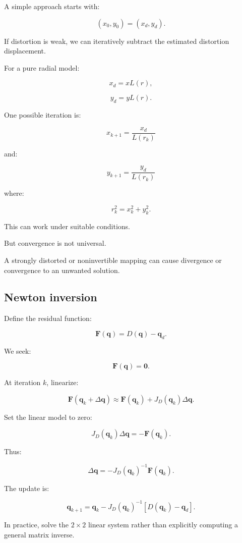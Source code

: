 A simple approach starts with:

\[
 \boxed{ (x_0,y_0)=(x_d,y_d) }.
\]

If distortion is weak, we can iteratively subtract the estimated distortion displacement.

For a pure radial model:

\[
 x_d=xL(r),
\]

\[
 y_d=yL(r).
\]

One possible iteration is:

\[
 \boxed{ x_{k+1}=\frac{x_d}{L(r_k)} }
\]

and:

\[
 \boxed{ y_{k+1}=\frac{y_d}{L(r_k)} }
\]

where:

\[
 r_k^2=x_k^2+y_k^2.
\]

This can work under suitable conditions.

But convergence is not universal.

A strongly distorted or noninvertible mapping can cause divergence or convergence to an unwanted solution.

\subsection{Newton inversion}\label{02-foundations-ii-ch035-newton-inversion}

Define the residual function:

\[
 \boxed{ \mathbf F(\mathbf q)= D(\mathbf q)-\mathbf q_d }.
\]

We seek:

\[
 \mathbf F(\mathbf q)=\mathbf0.
\]

At iteration \(k\), linearize:

\[
 \mathbf F(\mathbf q_k+\Delta\mathbf q) \approx \mathbf F(\mathbf q_k)+J_D(\mathbf q_k)\Delta\mathbf q.
\]

Set the linear model to zero:

\[
 J_D(\mathbf q_k)\Delta\mathbf q = -\mathbf F(\mathbf q_k).
\]

Thus:

\[
 \boxed{ \Delta\mathbf q = -J_D(\mathbf q_k)^{-1} \mathbf F(\mathbf q_k) }.
\]

The update is:

\[
 \boxed{ \mathbf q_{k+1} = \mathbf q_k- J_D(\mathbf q_k)^{-1} [D(\mathbf q_k)-\mathbf q_d] }.
\]

In practice, solve the \(2\times2\) linear system rather than explicitly computing a general matrix inverse.

